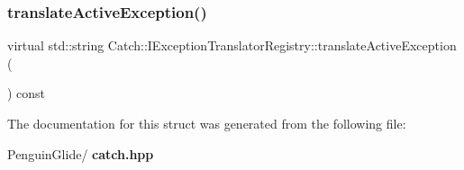 \subsubsection{translateActiveException()}
{\footnotesize\ttfamily virtual std\+::string Catch\+::\+I\+Exception\+Translator\+Registry\+::translate\+Active\+Exception (\begin{DoxyParamCaption}{ }\end{DoxyParamCaption}) const\hspace{0.3cm}{\ttfamily [pure virtual]}}



The documentation for this struct was generated from the following file\+:\begin{DoxyCompactItemize}
\item 
Penguin\+Glide/\textbf{ catch.\+hpp}\end{DoxyCompactItemize}
